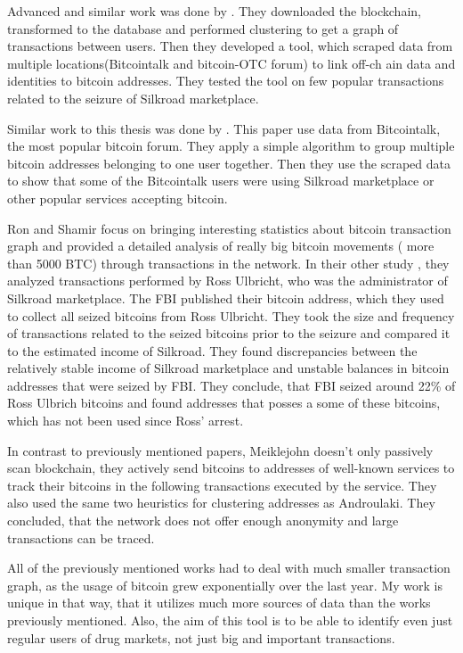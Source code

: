 \documentclass[
  digital, %
  table,   %
  lof,     %
  lot,     %
  oneside
]{fithesis3}
\begin{document}
Advanced and similar work was done by \parencite{spagnuolo2014bitiodine}. They downloaded the blockchain, transformed to
 the database
and performed clustering to get a graph of transactions between users.
Then they developed a tool, which scraped data from multiple locations(Bitcointalk and bitcoin-OTC forum) to link off-ch
ain data and identities to bitcoin addresses.
They tested the tool on few popular transactions related to the seizure of Silkroad marketplace.

Similar work to this thesis was done by \parencite{fleder2015bitcoin}.
This paper use data from Bitcointalk, the most popular bitcoin forum. 
They apply a simple algorithm to group multiple bitcoin addresses belonging to one user together.
Then they use the scraped data to show
that some of the Bitcointalk users were using Silkroad marketplace or other popular services accepting bitcoin.
 
Ron and Shamir \parencite{ron2013quantitative} focus on bringing
interesting statistics about bitcoin transaction graph
and provided a detailed analysis of really big bitcoin movements ( more than 5000 BTC) 
through transactions in the network.
In their other study \parencite{ron2014did}, they analyzed transactions performed by Ross Ulbricht,
who was the administrator of Silkroad marketplace.
The FBI published their bitcoin address, which they used to collect all seized bitcoins from Ross Ulbricht.
They took the size and frequency of transactions related to the seized bitcoins prior to the seizure and compared it to the estimated income of Silkroad. They found discrepancies between the
relatively stable income of Silkroad marketplace and unstable balances in bitcoin addresses
that were seized by FBI. They conclude, that FBI seized around 22\% of Ross Ulbrich bitcoins
and found addresses that posses a some of these bitcoins, which has not been used since Ross' arrest.

In contrast to previously mentioned papers, Meiklejohn \parencite{meiklejohn2013fistful} 
doesn't only passively scan blockchain, they actively send bitcoins to addresses of
well-known services to track their bitcoins in the following transactions executed by the service.
They also used the same two heuristics for clustering addresses
as Androulaki. \parencite{androulaki2013evaluating}
They concluded, that the network does not offer enough anonymity and large transactions can be traced.

All of the previously mentioned works had to deal with much smaller transaction graph, as the usage of bitcoin grew exponentially over the last year. 
My work is unique in that way, that it utilizes much more sources of data than the works previously mentioned. Also, the aim of this tool is to be able
to identify even just regular users of drug markets, not just big and important transactions.
\end{document}
